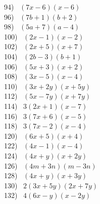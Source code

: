 \documentclass[12pt]{book}
\theoremstyle{definition}
\begin{document}
\begin{multicols}{3}
 94)~ $(7x-6)(x-6)$\\
 96)~ $(7b+1)(b+2)$\\
 98)~ $(5a+7)(a-4)$\\
 100)~ $(2x-1)(x-2)$\\
 102)~ $(2x+5)(x+7)$\\
 104)~ $(2b-3)(b+1)$\\
 106)~ $(5x+3)(x+2)$\\
 108)~ $(3x-5)(x-4)$\\
 110)~ $(3x+2y)(x+5y)$\\
 112)~ $(5x-7y)(x+7y)$\\
 114)~ $3(2x+1)(x-7)$\\
 116)~ $3(7x+6)(x-5)$\\
 118)~ $3(7x-2)(x-4)$\\
 120)~ $(6x+5)(x+4)$\\
 122)~ $(4x-1)(x-4)$\\
 124)~ $(4x+y)(x+2y)$\\
 126)~ $(4m+3n)(m-3n)$\\
 128)~ $(4x+y)(x+3y)$\\
 130)~ $2(3x+5y)(2x+7y)$\\
 132)~ $4(6x-y)(x-2y)$%
\end{multicols}
\end{document}
